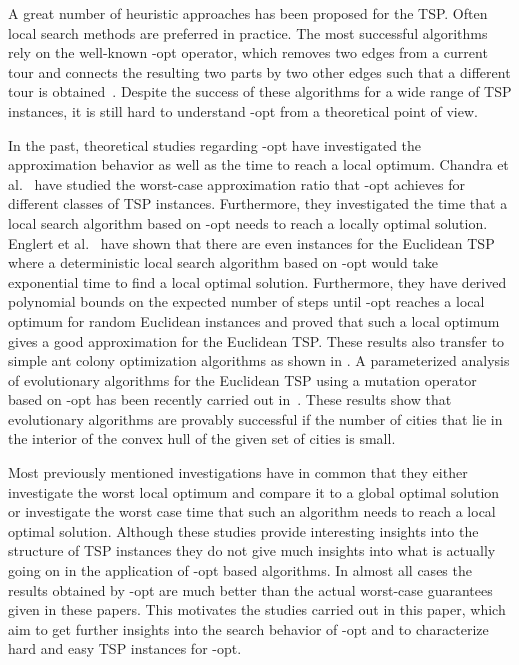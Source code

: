 \documentclass{article}
\begin{document}
A great number of heuristic approaches has been proposed for the
TSP. Often local search methods are preferred in
practice. The most successful algorithms rely on the well-known
-opt operator, which removes two edges from a current tour and
connects the resulting two parts by two other edges such that a
different tour is obtained~\cite{JohnsonG97}. Despite the success of
these algorithms for a wide range of TSP instances, it is still hard
to understand -opt from a theoretical point of view.

In the past, theoretical studies regarding -opt have investigated
the approximation behavior as well as the time to reach a local
optimum.  Chandra et al.~\cite{ChandraKT99} have studied the
worst-case approximation ratio that -opt achieves for different
classes of TSP instances. Furthermore, they investigated the time that
a local search algorithm based on -opt needs to reach a locally
optimal solution.  Englert et al.~\cite{EnglertRV07} have shown that
there are even instances for the Euclidean TSP where a deterministic
local search algorithm based on -opt would take exponential time to
find a local optimal solution. Furthermore, they have derived polynomial
bounds on the expected number of steps until -opt reaches a local
optimum for random Euclidean instances and proved that such a local
optimum gives a good approximation for the Euclidean TSP. These
results also transfer to simple ant colony optimization algorithms as
shown in \cite{AntsTsp10}.  A parameterized analysis of evolutionary
algorithms for the Euclidean TSP using a mutation operator based on
-opt has been recently carried out in~\cite{TSPAAAI12}. These
results show that evolutionary algorithms are provably successful if
the number of cities that lie in the interior of the convex hull of
the given set of  cities is small.

Most previously mentioned investigations have in common that they
either investigate the worst local optimum and compare it to a global
optimal solution or investigate the worst case time that such an
algorithm needs to reach a local optimal solution. Although these
studies provide interesting insights into the structure of TSP
instances they do not give much insights into what is actually
going on in the application of -opt based algorithms. In almost all
cases the results obtained by -opt are much better than the actual
worst-case guarantees given in these papers. This motivates the
studies carried out in this paper, which aim to get further insights
into the search behavior of -opt and to characterize hard and easy
TSP instances for -opt.
\end{document}
